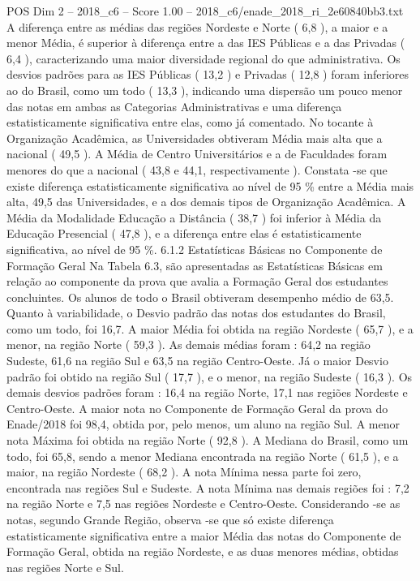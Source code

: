 \begin{textsample}{POS Dim 2 – 2018\_c6 – Score 1.00 – 2018\_c6/enade\_2018\_ri\_2e60840bb3.txt}
A diferença entre as médias das regiões Nordeste e Norte ( 6,8 ), a maior e a menor Média, é superior à diferença entre a das IES Públicas e a das Privadas ( 6,4 ), caracterizando uma maior diversidade regional do que administrativa.
Os desvios padrões para as IES Públicas ( 13,2 ) e Privadas ( 12,8 ) foram inferiores ao do Brasil, como um todo ( 13,3 ), indicando uma dispersão um pouco menor das notas em ambas as Categorias Administrativas e uma diferença estatisticamente significativa entre elas, como já comentado.
No tocante à Organização Acadêmica, as Universidades obtiveram Média mais alta que a nacional ( 49,5 ).
A Média de Centro Universitários e a de Faculdades foram menores do que a nacional ( 43,8 e 44,1, respectivamente ).
Constata -se que existe diferença estatisticamente significativa ao nível de 95 \% entre a Média mais alta, 49,5 das Universidades, e a dos demais tipos de Organização Acadêmica.
A Média da Modalidade Educação a Distância ( 38,7 ) foi inferior à Média da Educação Presencial ( 47,8 ), e a diferença entre elas é estatisticamente significativa, ao nível de 95 \%. 6.1.2 Estatísticas Básicas no Componente de Formação Geral Na Tabela 6.3, são apresentadas as Estatísticas Básicas em relação ao componente da prova que avalia a Formação Geral dos estudantes concluintes.
Os alunos de todo o Brasil obtiveram desempenho médio de 63,5.
Quanto à variabilidade, o Desvio padrão das notas dos estudantes do Brasil, como um todo, foi 16,7.
A maior Média foi obtida na região Nordeste ( 65,7 ), e a menor, na região Norte ( 59,3 ).
As demais médias foram : 64,2 na região Sudeste, 61,6 na região Sul e 63,5 na região Centro-Oeste.
Já o maior Desvio padrão foi obtido na região Sul ( 17,7 ), e o menor, na região Sudeste ( 16,3 ).
Os demais desvios padrões foram : 16,4 na região Norte, 17,1 nas regiões Nordeste e Centro-Oeste.
A maior nota no Componente de Formação Geral da prova do Enade/2018 foi 98,4, obtida por, pelo menos, um aluno na região Sul.
A menor nota Máxima foi obtida na região Norte ( 92,8 ).
A Mediana do Brasil, como um todo, foi 65,8, sendo a menor Mediana encontrada na região Norte ( 61,5 ), e a maior, na região Nordeste ( 68,2 ).
A nota Mínima nessa parte foi zero, encontrada nas regiões Sul e Sudeste.
A nota Mínima nas demais regiões foi : 7,2 na região Norte e 7,5 nas regiões Nordeste e Centro-Oeste.
Considerando -se as notas, segundo Grande Região, observa -se que só existe diferença estatisticamente significativa entre a maior Média das notas do Componente de Formação Geral, obtida na região Nordeste, e as duas menores médias, obtidas nas regiões Norte e Sul.

\end{textsample}
